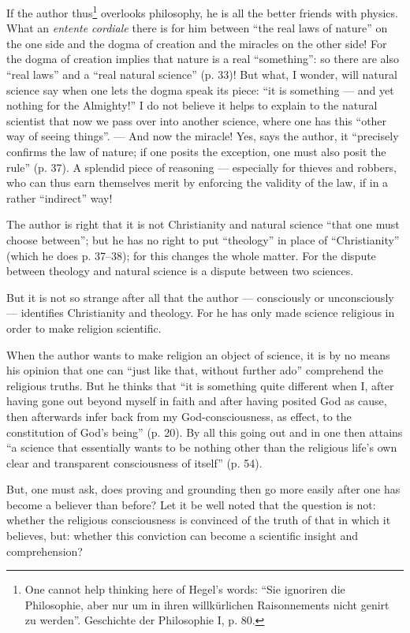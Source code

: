 \documentclass[12pt,a4paper]{book}
\newcommand{\opage}[1]{\marginnote{\footnotesize\textit{[#1]}}}
\begin{document}
If the author thus\footnote{One cannot help thinking here of Hegel's words: ``Sie ignoriren die Philosophie, aber nur um in ihren willkürlichen Raisonnements nicht genirt zu werden''. Geschichte der Philosophie I, p. 80.} overlooks philosophy, he is
all the better friends with physics. What an \textit{entente cordiale}
there is for him between ``the real laws of nature'' on the
one side and the dogma of creation and the miracles on the other
side! For the dogma of creation implies that nature is a real
``something'': so there are also ``real laws'' and a ``real
natural science'' (p. 33)! But what, I wonder, will natural science
\opage{8}\setcounter{footnote}{0}%
say when one lets the dogma speak its piece: ``it is something ---
and yet nothing for the Almighty!'' I do not believe it helps
to explain to the natural scientist that now we pass over into another
science, where one has this ``other way of seeing
things''. --- And now the miracle! Yes, says the author, it ``precisely
confirms the law of nature; if one posits the exception, one must also
posit the rule'' (p. 37). A splendid piece of reasoning --- especially
for thieves and robbers, who can thus earn themselves merit
by enforcing the validity of the law, if in a rather
``indirect'' way!

The author is right that it is not Christianity and natural science
``that one must choose between''; but he has no right
to put ``theology'' in place of ``Christianity'' (which
he does p. 37--38); for this changes the whole matter.
For the dispute between theology and natural science is a
dispute between two sciences.

But it is not so strange after all that the author --- consciously
or unconsciously --- identifies Christianity and theology. For
he has only made science religious in order to make religion
scientific.

When the author wants to make religion an object of science,
it is by no means his opinion that one can ``just like that,
without further ado'' comprehend the religious truths. But he
thinks that ``it is something quite different when I, after having
gone out beyond myself in faith and after having posited God
as cause, then afterwards infer back from my God-consciousness, as effect,
to the constitution of God's being'' (p. 20).
By all this going out and in one then attains ``a
science that essentially wants to be nothing other than the religious
life's own clear and transparent consciousness of
itself'' (p. 54).

But, one must ask, does proving and grounding then go
more easily after one has become a believer than before?
Let it be well noted that the question is not: whether the
\opage{9}\setcounter{footnote}{0}%
religious consciousness is convinced of the truth of that
in which it believes, but: whether this conviction can become
a scientific insight and comprehension?
\end{document}
